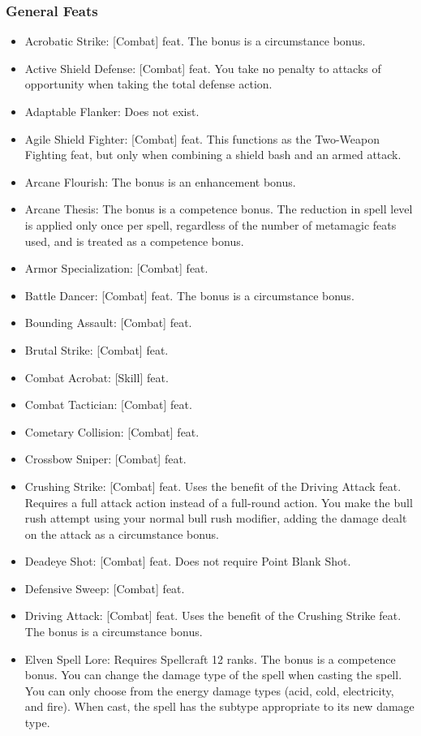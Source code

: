 \subsubsection{General Feats}
\begin{itemize}
\item Acrobatic Strike: [Combat] feat. The bonus is a circumstance bonus.
\item Active Shield Defense: [Combat] feat. You take no penalty to attacks of opportunity when taking the total defense action.
\item Adaptable Flanker: Does not exist.
\item Agile Shield Fighter: [Combat] feat. This functions as the Two-Weapon Fighting feat, but only when combining a shield bash and an armed attack.
\item Arcane Flourish: The bonus is an enhancement bonus.
\item Arcane Thesis: The bonus is a competence bonus. The reduction in spell level is applied only once per spell, regardless of the number of metamagic feats used, and is treated as a competence bonus.
\item Armor Specialization: [Combat] feat.
\item Battle Dancer: [Combat] feat. The bonus is a circumstance bonus.
\item Bounding Assault: [Combat] feat.
\item Brutal Strike: [Combat] feat.
\item Combat Acrobat: [Skill] feat.
\item Combat Tactician: [Combat] feat.
\item Cometary Collision: [Combat] feat.
\item Crossbow Sniper: [Combat] feat.
\item Crushing Strike: [Combat] feat. Uses the benefit of the Driving Attack feat. Requires a full attack action instead of a full-round action. You make the bull rush attempt using your normal bull rush modifier, adding the damage dealt on the attack as a circumstance bonus.
\item Deadeye Shot: [Combat] feat. Does not require Point Blank Shot.
\item Defensive Sweep: [Combat] feat.
\item Driving Attack: [Combat] feat. Uses the benefit of the Crushing Strike feat. The bonus is a circumstance bonus.
\item Elven Spell Lore: Requires Spellcraft 12 ranks. The bonus is a competence bonus. You can change the damage type of the spell when casting the spell. You can only choose from the energy damage types (acid, cold, electricity, and fire). When cast, the spell has the subtype appropriate to its new damage type.

\end{itemize}
